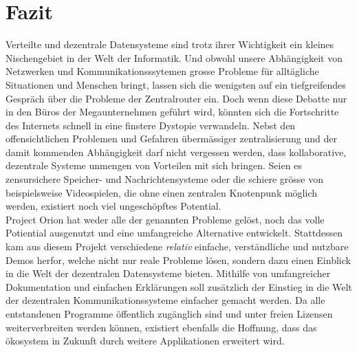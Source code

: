 \documentclass[11pt]{article}
\begin{document}
\section{Fazit}
\label{sec:org9a6b690}
Verteilte und dezentrale Datensysteme sind trotz ihrer Wichtigkeit ein
kleines Nischengebiet in der Welt der Informatik. Und obwohl unsere
Abhängigkeit von Netzwerken und Kommunikationsssytemen grosse Probleme
für alltägliche Situationen und Menschen bringt, lassen sich die
wenigsten auf ein tiefgreifendes Gespräch über die Probleme der
Zentralrouter ein. Doch wenn diese Debatte nur in den Büros der
Megaunternehmen geführt wird, könnten sich die Fortschritte des
Internets schnell in eine finstere Dystopie verwandeln. Nebst den
offensichtlichen Problemen und Gefahren übermässiger zentralisierung
und der damit kommenden Abhängigkeit darf nicht vergessen werden, dass
kollaborative, dezentrale Systeme unmengen von Vorteilen mit sich
bringen. Seien es zensursichere Speicher- und Nachrichtensysteme oder
die schiere grösse von beispielsweise Videospielen, die ohne einen
zentralen Knotenpunk möglich werden, existiert noch viel ungeschöpftes
Potential.\\

\noindent Project Orion hat weder alle der genannten Probleme gelöst,
noch das volle Potiential ausgenutzt und eine umfangreiche Alternative
entwickelt. Stattdessen kam aus diesem Projekt verschiedene \emph{relativ}
einfache, verständliche und nutzbare Demos herfor, welche nicht nur
reale Probleme lösen, sondern dazu einen Einblick in die Welt der
dezentralen Datensysteme bieten. Mithilfe von umfangreicher
Dokumentation und einfachen Erklärungen soll zusätzlich der Einstieg
in die Welt der dezentralen Kommunikationssysteme einfacher gemacht
werden. Da alle entstandenen Programme öffentlich zugänglich sind und
unter freien Lizensen weiterverbreiten werden können, existiert
ebenfalls die Hoffnung, dass das ökosystem in Zukunft durch weitere
Applikationen erweitert wird.


\end{document}
